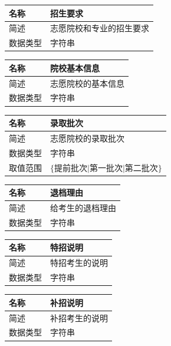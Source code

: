 \documentclass[CJK,utf8]{ctexrep}
\begin{document}
\begin{tabularx}{0.85\textwidth}{|l|X|}
	\hline
	\textbf{名称} & \textbf{招生要求} \\
	\hline
	简述 & 志愿院校和专业的招生要求 \\
	\hline
	数据类型 & 字符串 \\
	\hline
\end{tabularx}

\begin{tabularx}{0.85\textwidth}{|l|X|}
	\hline
	\textbf{名称} & \textbf{院校基本信息} \\
	\hline
	简述 & 志愿院校的基本信息 \\
	\hline
	数据类型 & 字符串 \\
	\hline
\end{tabularx}

\begin{tabularx}{0.85\textwidth}{|l|X|}
	\hline
	\textbf{名称} & \textbf{录取批次} \\
	\hline
	简述 & 志愿院校的录取批次\\
	\hline
	数据类型 & 字符串 \\
	\hline
	取值范围 & $\lbrace\text{提前批次}\vert\text{第一批次}\vert
	\text{第二批次}\rbrace$ \\
	\hline
\end{tabularx}

\begin{tabularx}{0.85\textwidth}{|l|X|}
	\hline
	\textbf{名称} & \textbf{退档理由} \\
	\hline
	简述 & 给考生的退档理由 \\
	\hline
	数据类型 & 字符串 \\
	\hline
\end{tabularx}

\begin{tabularx}{0.85\textwidth}{|l|X|}
	\hline
	\textbf{名称} & \textbf{特招说明} \\
	\hline
	简述 & 特招考生的说明 \\
	\hline
	数据类型 & 字符串 \\
	\hline
\end{tabularx}

\begin{tabularx}{0.85\textwidth}{|l|X|}
	\hline
	\textbf{名称} & \textbf{补招说明} \\
	\hline
	简述 & 补招考生的说明 \\
	\hline
	数据类型 & 字符串 \\
	\hline
\end{tabularx}
\end{document}
